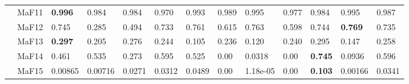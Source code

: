 \documentclass[]{article}
\begin{document}
\begin{landscape}
\begin{table}
\begin{footnotesize}
\begin{tabular}{|l|l|l|l|l|l|l|l|l|l|l|l|l|}
 & MaF11 & \cellcolor{gray95} {\bf 0.996} & 0.984 & 0.984 & 0.970 & \cellcolor{gray95} 0.993 & 0.989 & \cellcolor{gray95} 0.995 & 0.977 & 0.984 & \cellcolor{gray95} 0.995 & 0.987\\
 & MaF12 & 0.745 & 0.285 & 0.494 & 0.733 & \cellcolor{gray95} 0.761 & 0.615 & \cellcolor{gray95} 0.763 & 0.598 & 0.744 & \cellcolor{gray95} {\bf 0.769} & 0.735\\
 & MaF13 & \cellcolor{gray95} {\bf 0.297} & 0.205 & \cellcolor{gray95} 0.276 & 0.244 & 0.105 & 0.236 & 0.120 & 0.240 & \cellcolor{gray95} 0.295 & 0.147 & \cellcolor{gray95} 0.258\\
 & MaF14 & 0.461 & 0.535 & 0.273 & \cellcolor{gray95} 0.595 & 0.525 & 0.00 & 0.0318 & 0.00 & \cellcolor{gray95} {\bf 0.745} & 0.0936 & \cellcolor{gray95} 0.596\\
 & MaF15 & 0.00865 & 0.00716 & 0.0271 & \cellcolor{gray95} 0.0312 & \cellcolor{gray95} 0.0489 & 0.00 & 1.18e-05 & 0.00 & \cellcolor{gray95} {\bf 0.103} & 0.00166 & 0.0341\\
\hline


\end{tabular}
\end{footnotesize}
\end{table}
\end{landscape}
\end{document}
